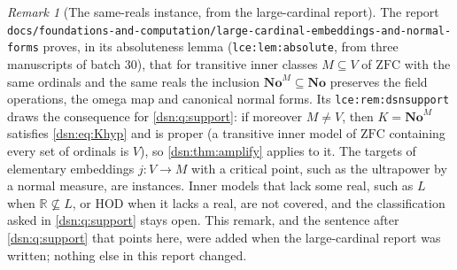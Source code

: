 \documentclass[11pt,a4paper]{article}
\numberwithin{equation}{section}
\theoremstyle{definition}
\theoremstyle{remark}
\newtheorem{remark}[remark]{Remark}
\newcommand{\No}{\mathbf{No}}
\newcommand{\HOD}{\mathrm{HOD}}
\newcommand{\ZFC}{\mathrm{ZFC}}
\newcommand{\R}{\mathbb R}
\newcommand{\lbl}[1]{\nolinkurl{#1}}
\newcommand{\fn}[1]{\nolinkurl{#1}}
\begin{document}
\begin{remark}[The same-reals instance, from the large-cardinal report]
\label{dsn:rem:largecardinal}
The report
\fn{docs/foundations-and-computation/large-cardinal-embeddings-and-normal-forms}
proves, in its absoluteness lemma (\lbl{lce:lem:absolute}, from three
manuscripts of batch 30), that for transitive inner classes $M\subseteq V$ of
$\ZFC$ with the same ordinals and the same reals the inclusion
$\No^M\subseteq\No$ preserves the field operations, the omega map and
canonical normal forms. Its \lbl{lce:rem:dsnsupport} draws the consequence
for \cref{dsn:q:support}: if moreover $M\ne V$, then $K=\No^M$ satisfies
\eqref{dsn:eq:Khyp} and is proper (a transitive inner model of $\ZFC$
containing every set of ordinals is $V$), so
\cref{dsn:thm:amplify} applies to it. The targets of elementary embeddings
$j:V\to M$ with a critical point, such as the ultrapower by a normal
measure, are instances. Inner models that lack some real, such as $L$ when
$\R\not\subseteq L$, or $\HOD$ when it lacks a real, are not covered, and the
classification asked in \cref{dsn:q:support} stays open. This remark, and
the sentence after \cref{dsn:q:support} that points here, were added when
the large-cardinal report was written; nothing else in this report changed.
\end{remark}
\end{document}
